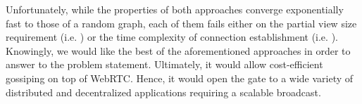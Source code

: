 Unfortunately, while the properties of both approaches converge exponentially
fast to those of a random graph, each of them fails either on the partial view
size requirement (i.e. \CYCLON{}) or the time complexity of connection
establishment (i.e. \SCAMPLON{}). Knowingly, we would like the best of the
aforementioned approaches in order to answer to the problem
statement. Ultimately, it would allow cost-efficient gossiping on top of
WebRTC. Hence, it would open the gate to a wide variety of distributed and
decentralized applications requiring a scalable broadcast.

